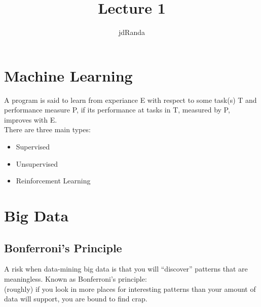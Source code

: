 \documentclass[10pt]{article}
\author{jdRanda}
\title{Lecture 1}
\begin{document}
    \maketitle


    \section{Machine Learning}
        A program is said to learn from experiance E with respect to some task(s) T and
        performance measure P, if its performance at tasks in T, measured by P, improves
        with E.\\
        There are three main types:

        \begin{itemize}
            \item Supervised
            \item Unsupervised
            \item Reinforcement Learning
        \end{itemize}

    \section{Big Data}

        \subsection{Bonferroni's Principle}
        A risk when data-mining big data is that you will “discover” patterns that are meaningless. Known as Bonferroni’s principle:\\
        (roughly) if you look in more places for interesting patterns than your amount of data will support, you are bound to find crap.
\end{document}
